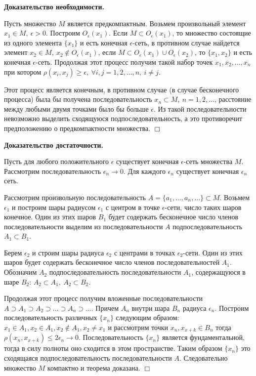 \documentclass[14pt]{extarticle}
\theoremstyle{definition}
\theoremstyle{remark}
\renewcommand{\[}{\begin{dmath*}[compact]}
\renewcommand{\]}{\end{dmath*}}
\newcommand{\sep}{ , \ \allowbreak }
\newcommand{\btev}[1][]{\textbf{Доказательство#1.}
}
\newcommand{\etev}{$\Box$}
\begin{document}
\btev[ необходимости]
  Пусть множество $M$ является предкомпактным. Возьмем произвольный элемент $x_1 \in M\sep \epsilon > 0$.
  Построим $O_{\epsilon}(x_1)$. Если $M \subset O_{\epsilon}(x_1)$, то множество состоящие из одного элемента $\{x_1\}$ и есть конечная $\epsilon$-сеть, в противном случае найдется элемент $x_2 \in M\sep x_2 \not\in O_\epsilon(x_1)$, если $M\subset O_\epsilon(x_1)\cup O_\epsilon(x_2)$, то $\{x_1,x_2\}$ и есть конечная $\epsilon$-сеть. Продолжая этот процесс получим такой набор точек $x_1, x_2,\dots,x_n$ при котором $\rho(x_i,x_j)\geq \epsilon\sep \forall i,j=1,2,\dots,n\sep i\neq j$.

  Этот процесс является конечным, в противном случае (в случае бесконечного процесса) была бы получена последовательность ${x_n}\subset M\sep n=1,2,\dots$, расстояние между любыми двумя точками было бы больше $\epsilon$. Из такой последовательности невозможно выделить сходящуюся подпоследовательность, а это противоречит предположению о предкомпактности множества.
\etev

\btev[ достаточности]
  Пусть для любого положительного $\epsilon$ существует конечная $\epsilon$-сеть множества $M$. Рассмотрим последовательность $\epsilon_n \to 0$. Для каждого $\epsilon_n$ существует конечная $\epsilon_n$ сеть.

  Рассмотрим произвольную последовательность $A=\{a_{1},\dots,a_n,\dots\}\subset M$. Возьмем $\epsilon_1$ и построим шары радиусом $\epsilon_1$ с центром в точке $\epsilon$-сети, число таких шаров конечное. Один из этих шаров $B_1$ будет содержать бесконечное число членов последовательности выделим из последовательности $A$ подпоследовательность $A_1\subset B_1$.

  Берем $\epsilon_2$ и строим шары радиуса $\epsilon_2$ с центрами в точках $\epsilon_2$-сети. Один из этих шаров будет содержать бесконечное число членов последовательностей $A_1$. Обозначим $A_2$ подпоследовательность последовательности $A_1$, содержащуюся в шаре $B_2$: $A_2\subset A_1\sep A_2\subset B_2$.

  Продолжая этот процесс получим вложенные последовательности $A\supset A_1\supset A_2\supset \dots\supset A_n\supset \dots$. Причем $A_n$ внутри шара $B_n$ радиуса $\epsilon_n$. Построим последовательность различных $\{x_n\}$ следующим образом: $x_1 \in A_1, x_2 \in A_1, x_2 \not\in A_1, x_2 \neq x_1$ и рассмотрим точки $x_n, x_{x+k} \in B_n$ тогда $\rho(x_n,x_{x+k})\leq 2 \epsilon_n \to 0$. Последовательность $\{x_n\}$ является фундаментальной, тогда в силу полноты оно сходится в этом пространстве. Таким образом $\{x_n\}$ это сходящаяся подпоследовательность последовательности $A$. Следовательно множество $M$ компактно и теорема доказана.
\etev
\end{document}
